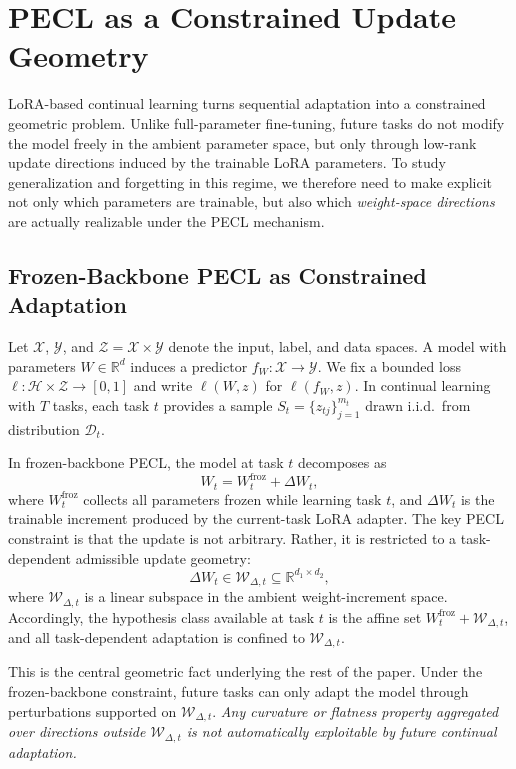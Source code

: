 \section{PECL as a Constrained Update Geometry}
\label{sec:pecl-geometry}

LoRA-based continual learning turns sequential adaptation into a constrained geometric problem.
Unlike full-parameter fine-tuning, future tasks do not modify the model freely in the ambient parameter space, but only through low-rank update directions induced by the trainable LoRA parameters.
To study generalization and forgetting in this regime, we therefore need to make explicit not only which parameters are trainable, but also which \emph{weight-space directions} are actually realizable under the PECL mechanism.

\subsection{Frozen-Backbone PECL as Constrained Adaptation}
\label{sec:decomp}

Let $\mathcal{X}$, $\mathcal{Y}$, and $\mathcal{Z} = \mathcal{X} \times \mathcal{Y}$ denote the input, label, and data spaces.
A model with parameters $W \in \mathbb{R}^d$ induces a predictor $f_W : \mathcal{X} \to \mathcal{Y}$.
We fix a bounded loss $\ell : \mathcal{H} \times \mathcal{Z} \to [0,1]$ and write $\ell(W,z)$ for $\ell(f_W,z)$.
In continual learning with $T$ tasks, each task $t$ provides a sample $S_t = \{z_{tj}\}_{j=1}^{m_t}$ drawn i.i.d.\ from distribution $\mathcal{D}_t$.

In frozen-backbone PECL, the model at task $t$ decomposes as
\[
W_t = W_t^{\mathrm{froz}} + \Delta W_t,
\]
where $W_t^{\mathrm{froz}}$ collects all parameters frozen while learning task $t$, and $\Delta W_t$ is the trainable increment produced by the current-task LoRA adapter.
The key PECL constraint is that the update is not arbitrary.
Rather, it is restricted to a task-dependent admissible update geometry:
\[
\Delta W_t \in \mathcal{W}_{\Delta,t} \subseteq \mathbb{R}^{d_1 \times d_2},
\]
where $\mathcal{W}_{\Delta,t}$ is a linear subspace in the ambient weight-increment space.
Accordingly, the hypothesis class available at task $t$ is the affine set $W_t^{\mathrm{froz}} + \mathcal{W}_{\Delta,t}$, and all task-dependent adaptation is confined to $\mathcal{W}_{\Delta,t}$.

This is the central geometric fact underlying the rest of the paper.
Under the frozen-backbone constraint, future tasks can only adapt the model through perturbations supported on $\mathcal{W}_{\Delta,t}$.
\emph{Any curvature or flatness property aggregated over directions outside $\mathcal{W}_{\Delta,t}$ is not automatically exploitable by future continual adaptation.}

